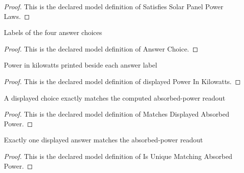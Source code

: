 \begin{proof}
  This is the declared model definition of Satisfies Solar Panel Power Laws.
\end{proof}
\begin{definition}
  \label{def:physics:phyx-mini-0945:phyxminiproblems-problemphyxmini0945-answerchoice}
  Labels of the four answer choices
\end{definition}
\begin{proof}
  This is the declared model definition of Answer Choice.
\end{proof}
\begin{definition}
  \label{def:physics:phyx-mini-0945:phyxminiproblems-problemphyxmini0945-displayedpowerinkilowatts}
  Power in kilowatts printed beside each answer label
\end{definition}
\begin{proof}
  This is the declared model definition of displayed Power In Kilowatts.
\end{proof}
\begin{definition}
  \label{def:physics:phyx-mini-0945:phyxminiproblems-problemphyxmini0945-matchesdisplayedabsorbedpower}
  A displayed choice exactly matches the computed absorbed-power readout
\end{definition}
\begin{proof}
  This is the declared model definition of Matches Displayed Absorbed Power.
\end{proof}
\begin{definition}
  \label{def:physics:phyx-mini-0945:phyxminiproblems-problemphyxmini0945-isuniquematchingabsorbedpower}
  Exactly one displayed answer matches the absorbed-power readout
\end{definition}
\begin{proof}
  This is the declared model definition of Is Unique Matching Absorbed Power.
\end{proof}
